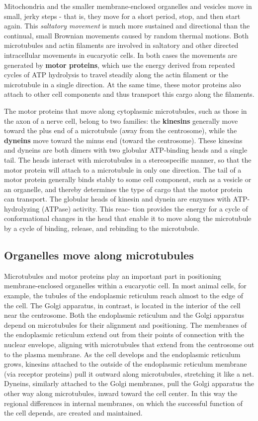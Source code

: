 Mitochondria and the smaller
membrane-enclosed organelles and vesicles move in small, jerky steps - that
is, they move for a short period, stop, and then start again. This
\textit{saltatory movement} is much more sustained and directional than the continual,
small Brownian movements caused by random thermal motions.
Both microtubules and actin filaments are involved in saltatory and other
directed intracellular movements in eucaryotic cells. In both cases the
movements are generated by \textbf{motor proteins}, which use the energy
derived from repeated cycles of ATP hydrolysis to travel steadily along the
actin filament or the microtubule in a single direction. At the same time,
these motor proteins also attach to other cell components and thus transport
this cargo along the filaments.

The motor proteins that move along cytoplasmic microtubules, such as
those in the axon of a nerve cell, belong to two families: the \textbf{kinesins}
generally move toward the plus end of a microtubule (away from the centrosome),
while the \textbf{dyneins} move toward the minus end (toward the centrosome).
These kinesins and dyneins are both dimers with two globular
ATP-binding heads and a single tail. The heads interact
with microtubules in a stereospecific manner, so that the motor protein
will attach to a microtubule in only one direction. The tail of a motor
protein generally binds stably to some cell component, such as a vesicle
or an organelle, and thereby determines the type of cargo that the motor
protein can transport. The globular heads of kinesin and
dynein are enzymes with ATP-hydrolyzing (ATPase) activity. This reac-
tion provides the energy for a cycle of conformational changes in the
head that enable it to move along the microtubule by a cycle of binding,
release, and rebinding to the microtubule.

\subsection{Organelles move along microtubules}

Microtubules and motor proteins play an important part in positioning
membrane-enclosed organelles within a eucaryotic cell. In most animal
cells, for example, the tubules of the endoplasmic reticulum reach
almost to the edge of the cell. The Golgi apparatus, in contrast,
is located in the interior of the cell near the centrosome.
Both the endoplasmic reticulum and the Golgi apparatus depend
on microtubules for their alignment and positioning. The membranes of
the endoplasmic reticulum extend out from their points of connection
with the nuclear envelope, aligning with microtubules
that extend from the centrosome out to the plasma membrane. As the
cell develops and the endoplasmic reticulum grows, kinesins attached to
the outside of the endoplasmic reticulum membrane (via receptor proteins)
pull it outward along microtubules, stretching it like a net. Dyneins,
similarly attached to the Golgi membranes, pull the Golgi apparatus the
other way along microtubules, inward toward the cell center. In this way
the regional differences in internal membranes, on which the successful
function of the cell depends, are created and maintained.

